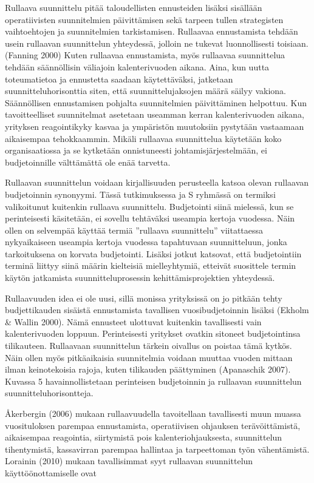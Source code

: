 \documentclass[12pt,a4paper,oneside,pdftex]{report}
\begin{document}
Rullaava suunnittelu pitää taloudellisten ennusteiden lisäksi sisällään operatiivisten suunnitelmien päivittämisen sekä tarpeen tullen strategisten vaihtoehtojen ja suunnitelmien tarkistamisen. Rullaavaa ennustamista tehdään usein rullaavan suunnittelun yhteydessä, jolloin ne tukevat luonnollisesti toisiaan. (Fanning 2000) Kuten rullaavaa ennustamista, myös rullaavaa suunnittelua tehdään säännöllisin väliajoin kalenterivuoden aikana. Aina, kun uutta toteumatietoa ja ennustetta saadaan käytettäväksi, jatketaan suunnitteluhorisonttia siten, että suunnittelujaksojen määrä säilyy vakiona. Säännöllisen ennustamisen pohjalta suunnitelmien päivittäminen helpottuu. Kun tavoitteelliset suunnitelmat asetetaan useamman kerran kalenterivuoden aikana, yrityksen reagointikyky kasvaa ja ympäristön muutoksiin pystytään vastaamaan aikaisempaa tehokkaammin. Mikäli rullaavaa suunnittelua käytetään koko organisaatiossa ja se kytketään onnistuneesti johtamisjärjestelmään, ei budjetoinnille välttämättä ole enää tarvetta.

Rullaavan suunnittelun voidaan kirjallisuuden perusteella katsoa olevan rullaavan budjetoinnin synonyymi. Tässä tutkimuksessa ja S ryhmässä on termiksi valikoitunut kuitenkin rullaava suunnittelu. Budjetointi siinä mielessä, kun se perinteisesti käsitetään, ei sovellu tehtäväksi useampia kertoja vuodessa. Näin ollen on selvempää käyttää termiä ”rullaava suunnittelu” viitattaessa nykyaikaiseen useampia kertoja vuodessa tapahtuvaan suunnitteluun, jonka tarkoituksena on korvata budjetointi. Lisäksi jotkut katsovat, että budjetointiin terminä liittyy siinä määrin kielteisiä mielleyhtymiä, etteivät suosittele termin käytön jatkamista suunnitteluprosessin kehittämisprojektien yhteydessä.

Rullaavuuden idea ei ole uusi, sillä monissa yrityksissä on jo pitkään tehty budjettikauden sisäistä ennustamista tavallisen vuosibudjetoinnin lisäksi (Ekholm & Wallin 2000). Nämä ennusteet ulottuvat kuitenkin tavallisesti vain kalenterivuoden loppuun. Perinteisesti yritykset ovatkin sitoneet budjetointinsa tilikauteen. Rullaavaan suunnittelun tärkein oivallus on poistaa tämä kytkös. Näin ollen myös pitkäaikaisia suunnitelmia voidaan muuttaa vuoden mittaan ilman keinotekoisia rajoja, kuten tilikauden päättyminen (Apanaschik 2007). Kuvassa 5 havainnollistetaan perinteisen budjetoinnin ja rullaavan suunnittelun suunnitteluhorisontteja.

Åkerbergin (2006) mukaan rullaavuudella tavoitellaan tavallisesti muun muassa vuosituloksen parempaa ennustamista, operatiivisen ohjauksen terävöittämistä, aikaisempaa reagointia, siirtymistä pois kalenteriohjauksesta, suunnittelun tihentymistä, kassavirran parempaa hallintaa ja tarpeettoman työn vähentämistä. Lorainin (2010) mukaan tavallisimmat syyt rullaavan suunnittelun käyttöönottamiselle ovat
\end{document}
